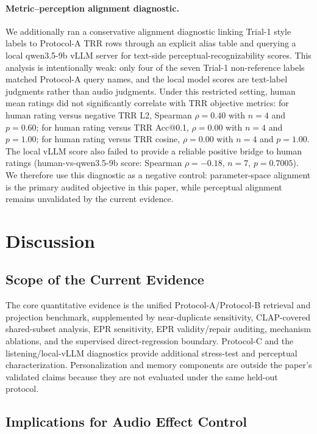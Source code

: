 \paragraph{Metric--perception alignment diagnostic.}
We additionally ran a conservative alignment diagnostic linking Trial-1 style labels to Protocol-A TRR rows through an explicit alias table and querying a local qwen3.5-9b vLLM server for text-side perceptual-recognizability scores. This analysis is intentionally weak: only four of the seven Trial-1 non-reference labels matched Protocol-A query names, and the local model scores are text-label judgments rather than audio judgments. Under this restricted setting, human mean ratings did not significantly correlate with TRR objective metrics: for human rating versus negative TRR L2, Spearman $\rho=0.40$ with $n=4$ and $p=0.60$; for human rating versus TRR Acc@0.1, $\rho=0.00$ with $n=4$ and $p=1.00$; for human rating versus TRR cosine, $\rho=0.00$ with $n=4$ and $p=1.00$. The local vLLM score also failed to provide a reliable positive bridge to human ratings (human-vs-qwen3.5-9b score: Spearman $\rho=-0.18$, $n=7$, $p=0.7005$). We therefore use this diagnostic as a negative control: parameter-space alignment is the primary audited objective in this paper, while perceptual alignment remains unvalidated by the current evidence.

\section{Discussion}
\label{sec:discussion}

\subsection{Scope of the Current Evidence}
\label{ssec:memory_exp}

The core quantitative evidence is the unified Protocol-A/Protocol-B retrieval and projection benchmark, supplemented by near-duplicate sensitivity, CLAP-covered shared-subset analysis, EPR sensitivity, EPR validity/repair auditing, mechanism ablations, and the supervised direct-regression boundary. Protocol-C and the listening/local-vLLM diagnostics provide additional stress-test and perceptual characterization. Personalization and memory components are outside the paper's validated claims because they are not evaluated under the same held-out protocol.

\subsection{Implications for Audio Effect Control}

